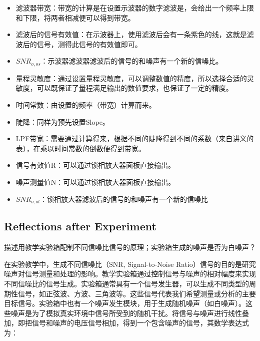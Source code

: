 \begin{enumerate}
\begin{itemize}
		\item 滤波器带宽：带宽的计算是在设置示波器的数字滤波是，会给出一个频率上限和下限，将两者相减便可以得到带宽。
		\item 滤波后的信号有效值：在示波器上，使用滤波后会有一条紫色的线，这就是滤波后的信号，测得此信号的有效值即可。
		\item $SNR_{o,os}$：示波器滤波器滤波后的信号的和噪声有一个新的信噪比。
		\item 量程灵敏度：通过设置量程灵敏度，可以调整数值的精度，所以选择合适的灵敏度，可以既保证了量程满足输出的数值要求，也保证了一定的精度。
		\item 时间常数：由设置的频率（带宽）计算而来。
		\item 陡降：同样为预先设置Slope。
		\item LPF带宽：需要通过计算得来，根据不同的陡降得到不同的系数（来自讲义的表），在乘以时间常数的倒数便得到带宽。
		\item 信号有效值R：可以通过锁相放大器面板直接输出。
		\item 噪声测量值N：可以通过锁相放大器面板直接输出。
		\item  $SNR_{o,ol}$：锁相放大器滤波后的信号的和噪声有一个新的信噪比
	\end{itemize}
	
\end{enumerate}



\subsection{Reflections after Experiment}

\begin{question}
	描述用教学实验箱配制不同信噪比信号的原理；实验箱生成的噪声是否为白噪声？
\end{question}
在实验教学中，生成不同信噪比（SNR, Signal-to-Noise Ratio）信号的目的是研究噪声对信号测量和处理的影响。教学实验箱通过控制信号与噪声的相对幅度来实现不同信噪比的信号生成。实验箱通常具有一个信号发生器，可以生成不同类型的周期性信号，如正弦波、方波、三角波等。这些信号代表我们希望测量或分析的主要目标信号。实验箱中也有一个噪声发生模块，用于生成随机噪声（如白噪声）。这些噪声是为了模拟真实环境中信号所受到的随机干扰。将信号与噪声进行线性叠加，即把信号和噪声的电压信号相加，得到一个包含噪声的信号，其数学表达式为：

